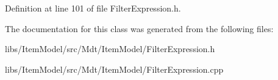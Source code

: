 Definition at line 101 of file Filter\+Expression.\+h.



The documentation for this class was generated from the following files\+:\begin{DoxyCompactItemize}
\item 
libs/\+Item\+Model/src/\+Mdt/\+Item\+Model/Filter\+Expression.\+h\item 
libs/\+Item\+Model/src/\+Mdt/\+Item\+Model/Filter\+Expression.\+cpp\end{DoxyCompactItemize}

